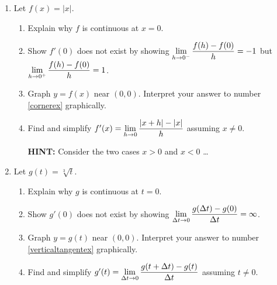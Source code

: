\begin{enumerate}
\setcounter{enumi}{\value{HW}}

\item Let  $f(x) =|x|$.  

\begin{enumerate}

\item  Explain why $f$ is continuous at $x = 0$.

\item\label{cornerex} Show $f'(0)$ does not exist by showing $\displaystyle{\lim_{h \rightarrow 0^{-}} \dfrac{f(h) - f(0)}{h} =-1}$ but  $\displaystyle{\lim_{h \rightarrow 0^{+}} \dfrac{f(h) - f(0)}{h} = 1}$.  

\smallskip
        
\item  Graph $y = f(x)$ near $(0,0)$.  Interpret your answer to number \ref{cornerex} graphically.

\smallskip

\item  Find and simplify  $f'(x) =  \displaystyle{\lim_{h \rightarrow 0} \dfrac{|x+h| - |x|}{h}}$ assuming $x \neq 0$.

\smallskip

\textbf{HINT:}  Consider the two cases $x > 0$ and $x < 0$ \ldots
        
\smallskip

\end{enumerate}


\item Let  $g(t) = \sqrt[3]{t}$.  

\begin{enumerate}

\item Explain why $g$ is continuous at $t = 0$.

\item\label{verticaltangentex} Show $g'(0)$ does not exist by showing $\displaystyle{\lim_{\Delta t \rightarrow 0} \dfrac{g(\Delta t) - g(0)}{\Delta t} = \infty}$.  

\smallskip
        
\item  Graph $y = g(t)$ near $(0,0)$.  Interpret your answer to number \ref{verticaltangentex} graphically.

\smallskip

\item  Find and simplify  $g'(t) =  \displaystyle{\lim_{\Delta t \rightarrow 0} \dfrac{g(t+\Delta t) - g(t)}{\Delta t}}$ assuming $t \neq 0$.


\end{enumerate}
\end{enumerate}
